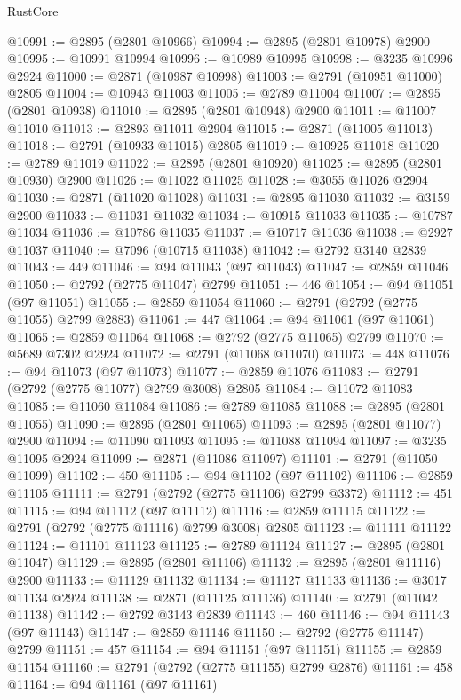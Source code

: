 \begin{lexlean}{RustCore}
\begin{coremodule}
@10991 := @2895 (@2801 @10966)
@10994 := @2895 (@2801 @10978) @2900
@10995 := @10991 @10994
@10996 := @10989 @10995
@10998 := @3235 @10996 @2924
@11000 := @2871 (@10987 @10998)
@11003 := @2791 (@10951 @11000) @2805
@11004 := @10943 @11003
@11005 := @2789 @11004
@11007 := @2895 (@2801 @10938)
@11010 := @2895 (@2801 @10948) @2900
@11011 := @11007 @11010
@11013 := @2893 @11011 @2904
@11015 := @2871 (@11005 @11013)
@11018 := @2791 (@10933 @11015) @2805
@11019 := @10925 @11018
@11020 := @2789 @11019
@11022 := @2895 (@2801 @10920)
@11025 := @2895 (@2801 @10930) @2900
@11026 := @11022 @11025
@11028 := @3055 @11026 @2904
@11030 := @2871 (@11020 @11028)
@11031 := @2895 @11030
@11032 := @3159 @2900
@11033 := @11031 @11032
@11034 := @10915 @11033
@11035 := @10787 @11034
@11036 := @10786 @11035
@11037 := @10717 @11036
@11038 := @2927 @11037
@11040 := @7096 (@10715 @11038)
@11042 := @2792 @3140 @2839
@11043 := 449
@11046 := @94 @11043 (@97 @11043)
@11047 := @2859 @11046
@11050 := @2792 (@2775 @11047) @2799
@11051 := 446
@11054 := @94 @11051 (@97 @11051)
@11055 := @2859 @11054
@11060 := @2791 (@2792 (@2775 @11055) @2799 @2883)
@11061 := 447
@11064 := @94 @11061 (@97 @11061)
@11065 := @2859 @11064
@11068 := @2792 (@2775 @11065) @2799
@11070 := @5689 @7302 @2924
@11072 := @2791 (@11068 @11070)
@11073 := 448
@11076 := @94 @11073 (@97 @11073)
@11077 := @2859 @11076
@11083 := @2791 (@2792 (@2775 @11077) @2799 @3008) @2805
@11084 := @11072 @11083
@11085 := @11060 @11084
@11086 := @2789 @11085
@11088 := @2895 (@2801 @11055)
@11090 := @2895 (@2801 @11065)
@11093 := @2895 (@2801 @11077) @2900
@11094 := @11090 @11093
@11095 := @11088 @11094
@11097 := @3235 @11095 @2924
@11099 := @2871 (@11086 @11097)
@11101 := @2791 (@11050 @11099)
@11102 := 450
@11105 := @94 @11102 (@97 @11102)
@11106 := @2859 @11105
@11111 := @2791 (@2792 (@2775 @11106) @2799 @3372)
@11112 := 451
@11115 := @94 @11112 (@97 @11112)
@11116 := @2859 @11115
@11122 := @2791 (@2792 (@2775 @11116) @2799 @3008) @2805
@11123 := @11111 @11122
@11124 := @11101 @11123
@11125 := @2789 @11124
@11127 := @2895 (@2801 @11047)
@11129 := @2895 (@2801 @11106)
@11132 := @2895 (@2801 @11116) @2900
@11133 := @11129 @11132
@11134 := @11127 @11133
@11136 := @3017 @11134 @2924
@11138 := @2871 (@11125 @11136)
@11140 := @2791 (@11042 @11138)
@11142 := @2792 @3143 @2839
@11143 := 460
@11146 := @94 @11143 (@97 @11143)
@11147 := @2859 @11146
@11150 := @2792 (@2775 @11147) @2799
@11151 := 457
@11154 := @94 @11151 (@97 @11151)
@11155 := @2859 @11154
@11160 := @2791 (@2792 (@2775 @11155) @2799 @2876)
@11161 := 458
@11164 := @94 @11161 (@97 @11161)

\end{coremodule}
\end{lexlean}

